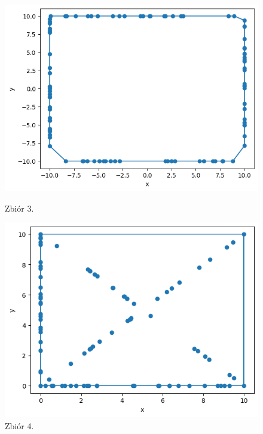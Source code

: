 \documentclass[11pt]{scrartcl}
\begin{document}
    \begin{figure}[H]
        \centering
        \begin{minipage}{0.45\linewidth}
          \centering
          \includegraphics[width=1\linewidth]{2_7.png}
          \caption{Zbiór 3.}
        \end{minipage}
        \begin{minipage}{0.45\linewidth}
          \centering
          \includegraphics[width=1\linewidth]{2_8.png}
          \caption{Zbiór 4.}
        \end{minipage}
    \end{figure}
\end{document}
